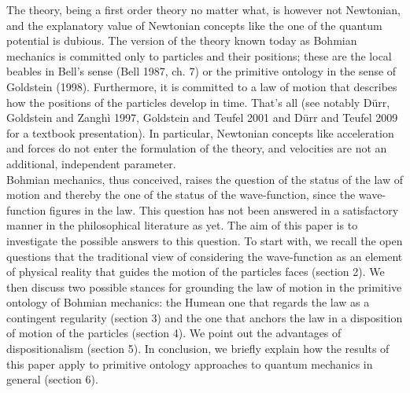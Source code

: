 \documentclass[12pt]{article}
\theoremstyle{definition}
\begin{document}
The theory, being a first order theory no matter what, is however not Newtonian, and the explanatory value of Newtonian concepts like the one of the quantum potential is dubious. The version of the theory known today as Bohmian mechanics is committed only to particles and their positions; these are the local beables in Bell's sense (Bell 1987, ch. 7) or the primitive ontology in the sense of Goldstein (1998). Furthermore, it is committed to a law of motion that describes how the positions of the particles develop in time. That's all (see notably D\"urr, Goldstein and Zangh\`i 1997, Goldstein and Teufel 2001 and D\"urr and Teufel 2009 for a textbook presentation). In particular, Newtonian concepts like acceleration and forces do not enter the formulation of the theory, and velocities are not an additional, independent parameter.\\
Bohmian mechanics, thus conceived, raises the question of the status of the law of motion and thereby the one of the status of the wave-function, since the wave-function figures in the law. This question has not been answered in a satisfactory manner in the philosophical literature as yet. The aim of this paper is to investigate the possible answers to this question. To start with, we recall the open questions that the traditional view of considering the wave-function as an element of physical reality that guides the motion of the particles faces (section 2). We then discuss two possible stances for grounding the law of motion in the primitive ontology of Bohmian mechanics: the Humean one that regards the law as a contingent regularity (section 3) and the one that anchors the law in a disposition of motion of the particles (section 4). We point out the advantages of dispositionalism (section 5). In conclusion, we briefly explain how the results of this paper apply to primitive ontology approaches to quantum mechanics in general (section 6).
\end{document}
